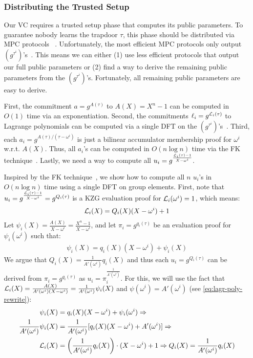 \subsubsection{Distributing the Trusted Setup}
\label{s:asvc:from-kzg:public-params}
Our VC requires a trusted setup phase that computes its public parameters.
To guarantee nobody learns the trapdoor $\tau$, this phase should be distributed via MPC protocols ~\cite{BGG18,BGM17,BCG+15}.
Unfortunately, the most efficient MPC protocols only output $(g^{\tau^i})$'s~\cite{BGM17}.
This means we can either (1) use less efficient protocols that output our full public parameters or (2) find a way to derive the remaining public parameters from the $(g^{\tau^i})$'s.
Fortunately, all remaining public parameters are easy to derive.

First, the commitment $a=g^{A(\tau)}$ to $A(X)=X^{n} - 1$ can be computed in $O(1)$ time via an exponentiation.
Second, the commitments $\ell_i=g^{\mathcal{L}_i(\tau)}$ to Lagrange polynomials can be computed via a single DFT on the $(g^{\tau^i})$'s~\cite[Sec 3.12.3, pg. 97]{Virza17}.
Third, each $a_i = g^{A(\tau)/(\tau -\omega^i)}$ is just a bilinear accumulator membership proof for $\omega^i$ w.r.t. $A(X)$.
Thus, all $a_i$'s can be computed in $O(n\log{n})$ time via the FK technique~\cite{FK20}.
Lastly, we need a way to compute all $u_i =  g^{\frac{\mathcal{L}_i(\tau)-1}{X-\omega^i}}$.

Inspired by the FK technique~\cite{FK20}, we show how to compute all $n$ $u_i$'s in $O(n\log{n})$ time using a single DFT on group elements.
First, note that $u_i=g^{\frac{\mathcal{L}_i(\tau)-1}{X-\omega^i}}=g^{Q_i(\tau)}$ is a KZG evaluation proof for $\mathcal{L}_i(\omega^i)=1$, which means:
\begin{align}
\mathcal{L}_i(X)=Q_i(X)(X-\omega^i) + 1
\end{align}
Let $\psi_i(X)=\frac{A(X)}{X-\omega^i}=\frac{X^n - 1}{X-\omega^i}$, and let $\pi_i=g^{q_i(\tau)}$ be an evaluation proof for $\psi_i(\omega^i)$ such that:
\begin{align}
\psi_i(X)=q_i(X)(X-\omega^i) + \psi_i(X)
\end{align}
We argue that $Q_i(X)=\frac{1}{A'(\omega^i)}q_i(X)$ and thus each $u_i=g^{Q_i(\tau)}$ can be derived from $\pi_i = g^{q_i(\tau)}$ as $u_i = \pi_i^{\frac{1}{A'(\omega^i)}}$.
For this, we will use the fact that $\mathcal{L}_i(X)=\frac{A(X)}{A'(\omega^i)(X-\omega^i)}=\frac{1}{A'(\omega^i)}\psi_i(X)$ and $\psi(\omega^i)=A'(\omega^i)$ (see \cref{eq:lagr-poly-rewrite}):
\begin{align}
\psi_i(X) &= q_i(X)(X-\omega^i) + \psi_i(\omega^i)\Rightarrow\\
\frac{1}{A'(\omega^i)}\psi_i(X) &= \frac{1}{A'(\omega^i)}[q_i(X)(X-\omega^i) + A'(\omega^i)]\Rightarrow\\
\mathcal{L}_i(X) &= \left(\frac{1}{A'(\omega^i)}q_i(X)\right) \cdot (X-\omega^i) + 1\Rightarrow Q_i(X) = \frac{1}{A'(\omega^i)}q_i(X)
\end{align}

